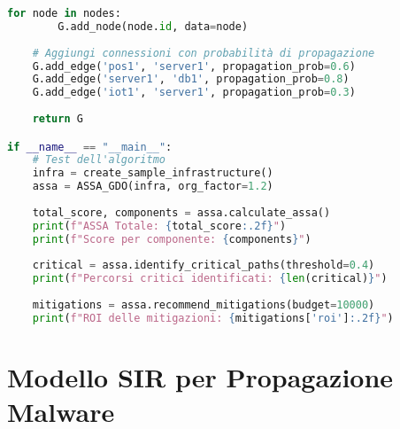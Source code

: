 \begin{lstlisting}[language=Python, caption=Implementazione dell'algoritmo ASSA-GDO]
    for node in nodes:
        G.add_node(node.id, data=node)
    
    # Aggiungi connessioni con probabilità di propagazione
    G.add_edge('pos1', 'server1', propagation_prob=0.6)
    G.add_edge('server1', 'db1', propagation_prob=0.8)
    G.add_edge('iot1', 'server1', propagation_prob=0.3)
    
    return G

if __name__ == "__main__":
    # Test dell'algoritmo
    infra = create_sample_infrastructure()
    assa = ASSA_GDO(infra, org_factor=1.2)
    
    total_score, components = assa.calculate_assa()
    print(f"ASSA Totale: {total_score:.2f}")
    print(f"Score per componente: {components}")
    
    critical = assa.identify_critical_paths(threshold=0.4)
    print(f"Percorsi critici identificati: {len(critical)}")
    
    mitigations = assa.recommend_mitigations(budget=10000)
    print(f"ROI delle mitigazioni: {mitigations['roi']:.2f}")
\end{lstlisting}

\section{\texorpdfstring{Modello SIR per Propagazione Malware}{C.2 - Modello SIR per Propagazione Malware}}

